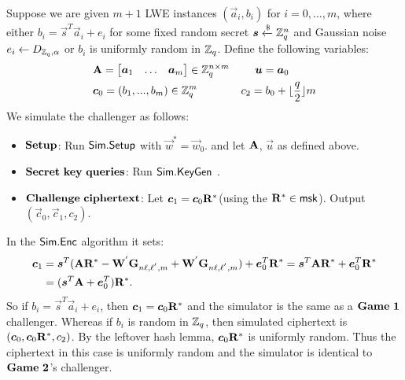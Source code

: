 Suppose we are given $m+1$ LWE instances $(\vec{a}_{i},b_{i})$ for $i=0,...,m$, where either $b_{i}=\vec{s}^{T}\vec{a}_{i}+e_{i}$ for some fixed random secret $\boldsymbol{s}\xleftarrow{\$} \mathbb{Z}^{n}_{q}$ and  Gaussian noise $e_{i}\leftarrow D_{\mathbb{Z}_{q},\alpha}$ or $b_{i}$ is uniformly random in $\mathbb{Z}_{q}$. Define the following variables:
\begin{equation}
\begin{split}
&\mathbf{A}=\begin{bmatrix}
\boldsymbol{a}_{1}&\ldots&\boldsymbol{a}_{m}
\end{bmatrix} \in \mathbb{Z}^{n \times m}_{q} ~~~~~~~ \boldsymbol{u}=\boldsymbol{a}_{0}\\
&\boldsymbol{c}_{0}=(b_{1},...,b_{m}) \in \mathbb{Z}^{m}_{q}~~~~~~~~~~~~c_{2}=b_{0}+\lfloor \frac{q}{2}\rfloor m\\
\end{split}
\end{equation}
We simulate the challenger as follows:
\begin{itemize}
\item $\mathbf{Setup}$: Run $\mathsf{Sim}.\mathsf{Setup}$ with $\vec{w}^{*}=\vec{w}_{0}$. and let $\mathbf{A}$, $\vec{u}$ as defined above.\\
\item $\mathbf{Secret}\  \mathbf{key}\  \mathbf{queries}$: Run $\mathsf{Sim}.\mathsf{KeyGen}$ .\\
\item $\mathbf{Challenge}\  \mathbf{ciphertext}$: Let $\boldsymbol{c}_{1}=\boldsymbol{c}_{0}\mathbf{R}^{*}$(using the $\mathbf{R}^{*} \in \mathsf{msk}$). Output $(\vec{c}_{0}, \vec{c}_{1}, c_{2})$.
\end{itemize}
In the $\mathsf{Sim}.\mathsf{Enc}$ algorithm it sets:
\begin{equation}
\begin{split}
\boldsymbol{c}_{1}&=\boldsymbol{s}^{T}(\mathbf{A}\mathbf{R}^{*}-\mathbf{W}^{'}\mathbf{G}_{n\ell,\ell^{'},m}+\mathbf{W}^{'}\mathbf{G}_{n\ell,\ell^{'},m})+\boldsymbol{e}^{T}_{0}\mathbf{R}^{*}=\boldsymbol{s}^{T}\mathbf{A}\mathbf{R}^{*}+\boldsymbol{e}^{T}_{0}\mathbf{R}^{*}\\
&=(\boldsymbol{s}^{T}\mathbf{A}+\boldsymbol{e}^{T}_{0})\mathbf{R}^{*}.
\end{split}
\end{equation}
So if $b_{i}=\vec{s}^{T}\vec{a}_{i}+e_{i}$, then $\boldsymbol{c}_{1}=\boldsymbol{c}_{0}\mathbf{R}^{*}$ and the simulator is the same as a $\mat{Game\ 1}$ challenger. Whereas if $b_{i}$ is random in $\mathbb{Z}_{q}$, then simulated ciphertext is $(\boldsymbol{c}_{0}, \boldsymbol{c}_{0}\mathbf{R}^{*}, c_{2})$. By the leftover hash lemma, $\boldsymbol{c}_{0}\mathbf{R}^{*}$ is uniformly random. Thus the ciphertext in this case is uniformly random and the simulator is identical to $\mat{Game\ 2}$'s challenger.\

